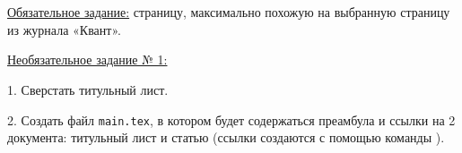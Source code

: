 \documentclass[a4paper,10pt]{article}
\title{}
\author{}
\date{}
\begin{document}

\setcounter{page}{3}

\fontsize{14pt}{14pt}\selectfont
\section*{\fontsize{16pt}{16pt}\selectfont {}}
\underline{Обязательное задание:}
 страницу, максимально похожую на выбранную страницу
из журнала «Квант».

\vspace{3mm}
\noindent\underline{Необязательное задание № 1:}

1. Сверстать титульный лист.

2. Создать файл \verb|main.tex|, в котором будет содержаться преамбула и
ссылки на 2 документа: титульный лист и статью (ссылки создаются с
помощью команды \verb||).

\newpage
\end{document}
